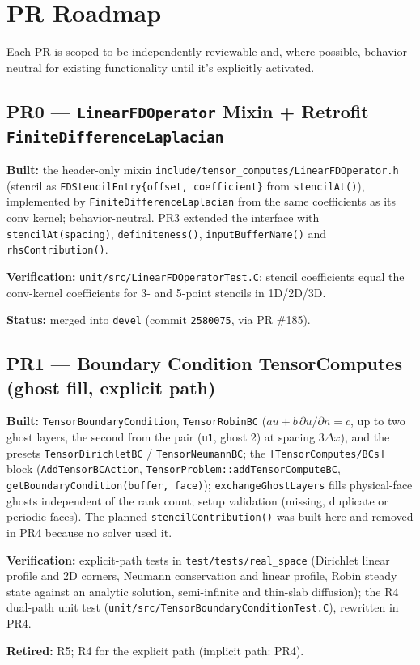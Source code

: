 \documentclass[11pt]{article}
\newcommand{\pr}[2]{\subsection{PR#1 --- #2}}
\newcommand{\status}[1]{\textcolor{marlinteal}{\textbf{Status:}} #1}
\begin{document}
\section{PR Roadmap}
\label{sec:roadmap}

Each PR is scoped to be independently reviewable and, where possible,
behavior-neutral for existing functionality until it's explicitly
activated.

\pr{0}{\texttt{LinearFDOperator} Mixin + Retrofit \texttt{FiniteDifferenceLaplacian}}
\textbf{Built:} the header-only mixin
\texttt{include/tensor\_computes/LinearFDOperator.h} (stencil as
\texttt{FDStencilEntry\{offset, coefficient\}} from \texttt{stencilAt()}),
implemented by \texttt{FiniteDifferenceLaplacian} from the same coefficients
as its conv kernel; behavior-neutral. PR3 extended the interface with
\texttt{stencilAt(spacing)}, \texttt{definiteness()},
\texttt{inputBufferName()} and \texttt{rhsContribution()}.

\textbf{Verification:} \texttt{unit/src/LinearFDOperatorTest.C}: stencil
coefficients equal the conv-kernel coefficients for 3- and 5-point stencils
in 1D/2D/3D.

\status{merged into \texttt{devel} (commit \texttt{2580075}, via PR \#185).}

\pr{1}{Boundary Condition TensorComputes (ghost fill, explicit path)}
\textbf{Built:} \texttt{TensorBoundaryCondition},
\texttt{TensorRobinBC} ($a u + b\,\partial u/\partial n = c$, up to two ghost
layers, the second from the pair (\texttt{u1}, ghost 2) at spacing
$3\Delta x$), and the presets \texttt{TensorDirichletBC} /
\texttt{TensorNeumannBC}; the \texttt{[TensorComputes/BCs]} block
(\texttt{AddTensorBCAction}, \texttt{TensorProblem::addTensorComputeBC},
\texttt{getBoundaryCondition(buffer, face)}); \texttt{exchangeGhostLayers}
fills physical-face ghosts independent of the rank count; setup validation
(missing, duplicate or periodic faces). The planned
\texttt{stencilContribution()} was built here and removed in PR4 because no
solver used it.

\textbf{Verification:} explicit-path tests in \texttt{test/tests/real\_space}
(Dirichlet linear profile and 2D corners, Neumann conservation and linear
profile, Robin steady state against an analytic solution, semi-infinite
and thin-slab diffusion); the R4 dual-path unit test
(\texttt{unit/src/TensorBoundaryConditionTest.C}), rewritten in PR4.

\textbf{Retired:} R5; R4 for the explicit path (implicit path: PR4).
\end{document}
